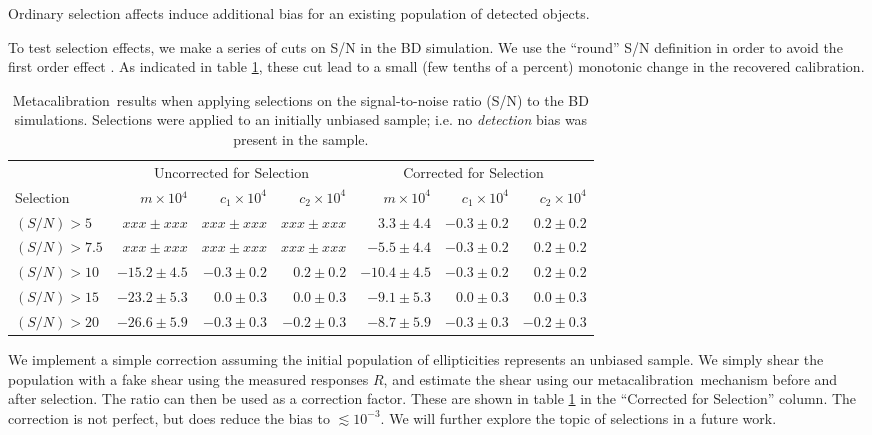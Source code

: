 \documentclass[usegraphicx,usenatbib]{mn2e}
\newcommand{\mcal}{metacalibration}
\newcommand{\Mcal}{Metacalibration}
\newcommand{\mcalR}{$R$}
\begin{document}
Ordinary selection affects induce additional bias for an existing population of
detected objects.

To test selection effects, we make a series of cuts on S/N in the BD
simulation.  We use the ``round'' S/N definition in order to avoid the first
order effect \citep{DESSVShear}. As indicated in table \ref{tab:selresults},
these cut lead to a small (few tenths of a percent) monotonic change in the
recovered calibration.

\begin{table}
    \centering
    \caption{\Mcal\ results when applying selections on the signal-to-noise ratio (S/N) to the BD simulations. Selections
    were applied to an initially unbiased sample; i.e. no {\em detection}
    bias was present in the sample. \label{tab:selresults}}
    \begin{tabular}{ |l| r|r|r|  r|r|r|}
        \hline
        & \multicolumn{3}{c}{Uncorrected for Selection} & \multicolumn{3}{c}{Corrected for Selection} \\
        Selection & $m \times 10{^4} $ & $c_1 \times 10^4$ & $c_2 \times 10^4$ & $m \times 10^{4}$ & $c_1 \times 10^4$ & $c_2 \times 10^4$ \\
        \hline
        $(S/N) > 5$  & $xxx \pm xxx$ & $xxx \pm xxx$ & $xxx \pm xxx$ & $3.3 \pm 4.4$ & $-0.3 \pm 0.2$ & $0.2 \pm 0.2$  \\
        $(S/N) > 7.5$  & $xxx \pm xxx$ & $xxx \pm xxx$ & $xxx \pm xxx$ & $-5.5 \pm 4.4$ & $-0.3 \pm 0.2$ & $0.2 \pm 0.2$  \\
        $(S/N) > 10$  & $-15.2 \pm 4.5$ & $-0.3 \pm 0.2$ & $0.2 \pm 0.2$ & $-10.4 \pm 4.5$ & $-0.3 \pm 0.2$ & $0.2 \pm 0.2$  \\
        $(S/N) > 15$  & $-23.2 \pm 5.3$ & $0.0 \pm 0.3$ & $0.0 \pm 0.3$ & $-9.1 \pm 5.3$ & $0.0 \pm 0.3$ & $0.0 \pm 0.3$  \\
        $(S/N) > 20$  & $-26.6 \pm 5.9$ & $-0.3 \pm 0.3$ & $-0.2\pm 0.3$ & $-8.7 \pm 5.9$ & $-0.3 \pm 0.3$ & $-0.2 \pm 0.3$  \\
    \end{tabular}
\end{table}

We implement a simple correction assuming the initial population of
ellipticities represents an unbiased sample.  We simply shear the population
with a fake shear using the measured responses \mcalR, and estimate the shear
using our \mcal\ mechanism before and after selection.  The ratio can then be
used as a correction factor.  These are shown in table \ref{tab:selresults} in
the ``Corrected for Selection'' column.  The correction is not perfect, but
does reduce the bias to $\lesssim 10^{-3}$.  We will further explore the topic of
selections in a future work.
\end{document}
